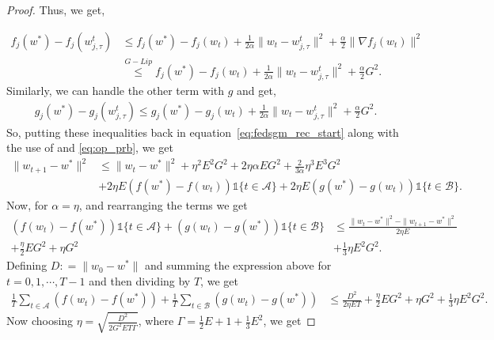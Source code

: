 \documentclass{article} %
\def\eqref#1{equation~\ref{#1}}
\def\A{{\mathcal A}}
\def\B{{\mathcal B}}
\begin{document}
\begin{proof}
Thus, we get,

\begin{align*}
f_j(w^*) - f_j(w_{j,\tau}^t)
&\leq f_j(w^*) - f_j(w_t) + \frac{1}{2\alpha} \| w_t - w_{j,\tau}^t \|^2 + \frac{\alpha}{2} \| \nabla f_j(w_t) \|^2
\\
&\overset{G-Lip}{\leq}f_j(w^*) - f_j(w_t) + \frac{1}{2\alpha} \| w_t - w_{j,\tau}^t \|^2 + \frac{\alpha}{2}G^2.
\end{align*}
Similarly, we can handle the other term with $g$ and get,
\begin{align*}
g_j(w^*) - g_j(w_{j,\tau}^t)\leq g_j(w^*) - g_j(w_t) + \frac{1}{2\alpha} \| w_t - w_{j,\tau}^t \|^2 + \frac{\alpha}{2}G^2.
\end{align*}
So, putting these inequalities back in \eqref{eq:fedsgm_rec_start} along with the use of  and \cref{eq:op_prb}, we get
\begin{equation*}
    \begin{aligned}
        \| w_{t+1} - w^* \|^2 &\leq \| w_t - w^* \|^2  + \eta^2 E^2 G^2 + 2\eta \alpha E G^2 
        + \frac{2}{3\alpha}\eta^3E^3G^2 
        \\
        &+ 2\eta E (f(w^*) - f(w_t))\mathds{1}\{t \in \A\} + 2\eta E (g(w^*) - g(w_t))\mathds{1}\{t \in \B\}.
    \end{aligned}
\end{equation*}
Now, for $\alpha = \eta$, and rearranging the terms we get
\begin{equation*}
    \begin{aligned}
        (f(w_t) - f(w^*) )\mathds{1}\{t \in \A\} + (g(w_t) - g(w^*))\mathds{1}\{t \in \B\} &\leq \frac{\| w_t - w^* \|^2 - \| w_{t+1} - w^* \|^2}{2\eta E} \\+ \frac{\eta}{2} E G^2 + \eta G^2 
        &+ \frac{1}{3}\eta E^2G^2.
    \end{aligned}
\end{equation*}
Defining $D: = \|w_0 - w^*\|$ and summing the expression above for $t = 0,1, \cdots, T-1$ and then dividing by $T$, we get
\begin{equation*}
    \begin{aligned}
        \frac{1}{T}\sum_{t\in \A}(f(w_t) - f(w^*) ) + \frac{1}{T}\sum_{t\in \B}(g(w_t) - g(w^*)) &\leq \frac{D^2}{2\eta E T} + \frac{\eta}{2} E G^2 + \eta G^2 
        + \frac{1}{3}\eta E^2G^2.
    \end{aligned}
\end{equation*}
Now choosing $\eta = \sqrt{\frac{D^2}{2G^2 E T \Gamma}}$, where $\Gamma = \frac{1}{2} E + 1 + \frac{1}{3} E^2$, we get

\end{proof}
\end{document}
